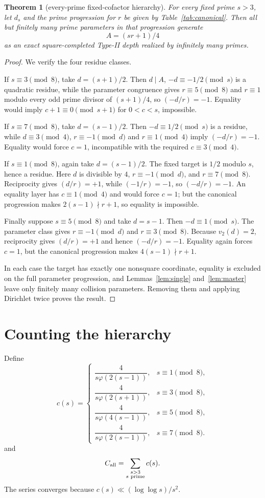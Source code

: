 \documentclass[11pt]{article}
\newtheorem{theorem}{Theorem}
\theoremstyle{definition}
\begin{document}
\begin{theorem}[every-prime fixed-cofactor hierarchy]\label{thm:allprime}
For every fixed prime $s>3$, let $d_s$ and the prime progression for $r$ be given by Table~\ref{tab:canonical}. Then all but finitely many prime parameters in that progression generate
\[
\boxed{A=(sr+1)/4}
\]
as an exact square-completed Type-II depth realized by infinitely many primes.
\end{theorem}

\begin{proof}
We verify the four residue classes.

If $s\equiv3\pmod8$, take $d=(s+1)/2$. Then $d\mid A$, $-d\equiv-1/2\pmod s$ is a quadratic residue, while the parameter congruence gives $r\equiv5\pmod8$ and $r\equiv1$ modulo every odd prime divisor of $(s+1)/4$, so $(-d/r)=-1$. Equality would imply $c+1\equiv0\pmod{s+1}$ for $0<c<s$, impossible.

If $s\equiv7\pmod8$, take $d=(s-1)/2$. Then $-d\equiv1/2\pmod s$ is a residue, while $d\equiv3\pmod4$, $r\equiv-1\pmod d$ and $r\equiv1\pmod4$ imply $(-d/r)=-1$. Equality would force $c=1$, incompatible with the required $c\equiv3\pmod4$.

If $s\equiv1\pmod8$, again take $d=(s-1)/2$. The fixed target is $1/2$ modulo $s$, hence a residue. Here $d$ is divisible by $4$, $r\equiv-1\pmod d$, and $r\equiv7\pmod8$. Reciprocity gives $(d/r)=+1$, while $(-1/r)=-1$, so $(-d/r)=-1$. An equality layer has $c\equiv1\pmod4$ and would force $c=1$; but the canonical progression makes $2(s-1)\nmid r+1$, so equality is impossible.

Finally suppose $s\equiv5\pmod8$ and take $d=s-1$. Then $-d\equiv1\pmod s$. The parameter class gives $r\equiv-1\pmod d$ and $r\equiv3\pmod8$. Because $v_2(d)=2$, reciprocity gives $(d/r)=+1$ and hence $(-d/r)=-1$. Equality again forces $c=1$, but the canonical progression makes $4(s-1)\nmid r+1$.

In each case the target has exactly one nonsquare coordinate, equality is excluded on the full parameter progression, and Lemmas~\ref{lem:single} and~\ref{lem:master} leave only finitely many collision parameters. Removing them and applying Dirichlet twice proves the result.
\end{proof}

\section{Counting the hierarchy}
Define
\[
c(s)=
\begin{cases}
\dfrac{4}{s\varphi(2(s-1))},&s\equiv1\pmod8,\\[6pt]
\dfrac{4}{s\varphi(2(s+1))},&s\equiv3\pmod8,\\[6pt]
\dfrac{4}{s\varphi(4(s-1))},&s\equiv5\pmod8,\\[6pt]
\dfrac{4}{s\varphi(2(s-1))},&s\equiv7\pmod8.
\end{cases}
\]
and
\[
C_{\rm all}=\sum_{\substack{s>3\\s\text{ prime}}}c(s).
\]
The series converges because $c(s)\ll(\log\log s)/s^2$.
\end{document}
